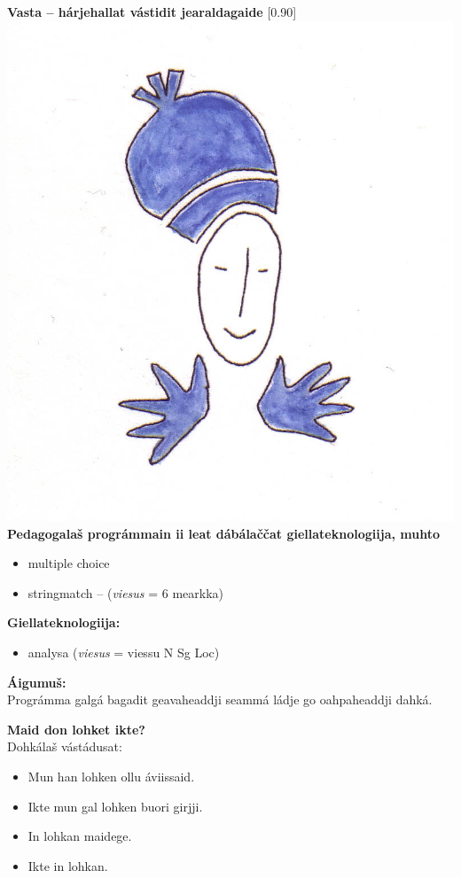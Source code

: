 \documentclass[landscape,norsk,11pt]{seminar}
\begin{document}
\begin{slide}
\newslide
\textbf{Vasta -- hárjehallat vástidit jearaldagaide}
\scalebox{0.90}[0.90]{\includegraphics{img/vasta.png}} \\


\newslide
\textbf{Pedagogalaš prográmmain ii leat dábálaččat giellateknologiija, muhto} 
\begin{itemize}
\item multiple choice 
\item stringmatch -- (\textit{viesus} = 6 mearkka) 
\end{itemize}

\textbf{Giellateknologiija:}
\begin{itemize}
\item analysa (\textit{viesus} = viessu N Sg Loc) 
\end{itemize}

\newslide
\textbf{Áigumuš:}\\
Prográmma galgá bagadit geavaheaddji seammá ládje go oahpaheaddji dahká.

\newslide
\textbf{Maid don lohket ikte?} \\
Dohkálaš vástádusat:
\begin{itemize}
\item Mun han lohken ollu \'aviissaid. 
\item Ikte mun gal lohken buori girjji. 
\item In lohkan maidege. 
\item Ikte in lohkan.
\end{itemize}


\end{slide}
\end{document}
